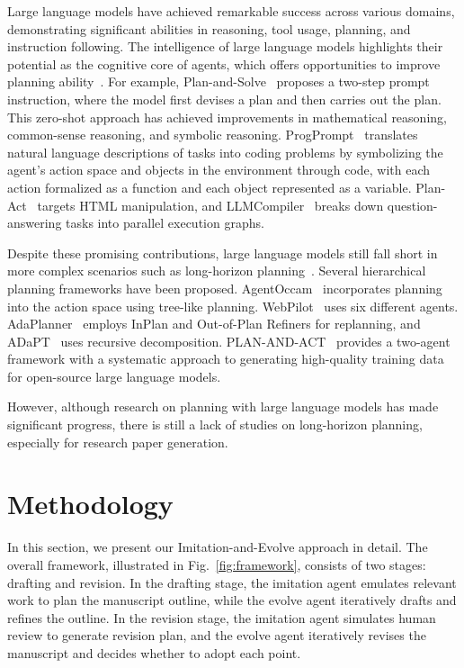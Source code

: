 \documentclass[manuscript,review,anonymous]{acmart}
\begin{document}
Large language models have achieved remarkable success across various domains, demonstrating significant abilities in reasoning, tool usage, planning, and instruction following. The intelligence of large language models highlights their potential as the cognitive core of agents, which offers opportunities to improve planning ability~\cite{huang2024understanding}. For example, Plan-and-Solve~\cite{wang2023plan} proposes a two-step prompt instruction, where the model first devises a plan and then carries out the plan. This zero-shot approach has achieved improvements in mathematical reasoning, common-sense reasoning, and symbolic reasoning. ProgPrompt~\cite{singh2023progprompt} translates natural language descriptions of tasks into coding problems by symbolizing the agent’s action space and objects in the environment through code, with each action formalized as a function and each object represented as a variable. Plan-Act~\cite{erdogan2025planact} targets HTML manipulation, and LLMCompiler~\cite{kim2024llm} breaks down question-answering tasks into parallel execution graphs.

Despite these promising contributions, large language models still fall short in more complex scenarios such as long-horizon planning~\cite{chen2024can}. Several hierarchical planning frameworks have been proposed. AgentOccam~\cite{yangagentoccam} incorporates planning into the action space using tree-like planning. WebPilot~\cite{zhang2025webpilot} uses six different agents. AdaPlanner~\cite{sun2023adaplanner} employs InPlan and Out-of-Plan Refiners for replanning, and ADaPT~\cite{prasad2024adapt} uses recursive decomposition. PLAN-AND-ACT~\cite{erdogan2025plan} provides a two-agent framework with a systematic approach to generating high-quality training data for open-source large language models.

However, although research on planning with large language models has made significant progress, there is still a lack of studies on long-horizon planning, especially for research paper generation.

\section{Methodology}

In this section, we present our Imitation-and-Evolve approach in detail. The overall framework, illustrated in Fig.~\ref{fig:framework}, consists of two stages: drafting and revision. In the drafting stage, the imitation agent emulates relevant work to plan the manuscript outline, while the evolve agent iteratively drafts and refines the outline. In the revision stage, the imitation agent simulates human review to generate revision plan, and the evolve agent iteratively revises the manuscript and decides whether to adopt each point.
\end{document}
